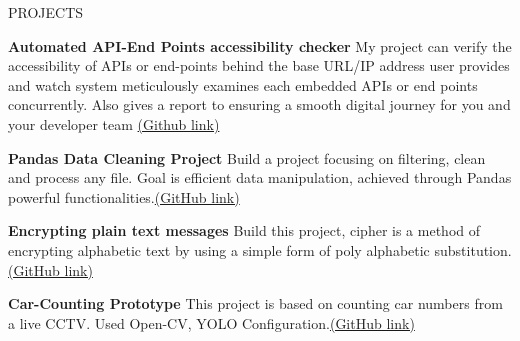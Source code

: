 \documentclass{resume} %
\begin{document}
\clearpage %
\begin{rSection}{PROJECTS}
\vspace{-1.25em}
\item \textbf{Automated API-End Points accessibility checker} {My project can verify the accessibility of APIs or end-points behind the base URL/IP address user provides and watch system meticulously examines each embedded APIs or end points concurrently. Also gives a report to ensuring a smooth digital journey for you and your developer team \href{https://github.com/akashsarkar1998/Automated-API-End-Points-accessibility-checker}{(Github link)}}
\item \textbf{Pandas Data Cleaning Project} {Build a project focusing on filtering, clean and process any file. Goal is efficient data manipulation, achieved through Pandas powerful functionalities.\href{https://github.com/akashsarkar1998/Data_Cleaning_with_Pandas}{(GitHub link)}}
\item \textbf{Encrypting plain text messages} {Build this project, cipher is a method of encrypting alphabetic text by using a simple form of poly alphabetic substitution. \href{https://github.com/akashsarkar1998/Vigenere_Cipher}{(GitHub link)}}
\item \textbf{Car-Counting Prototype} {This project is based on counting car numbers from a live CCTV. Used Open-CV, YOLO Configuration.\href{https://github.com/akashsarkar1998/Counting-car}{(GitHub link)}}
\end{rSection} 
\end{document}
